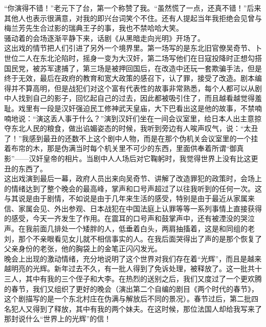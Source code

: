 “你演得不错！”老元下了台，第一个称赞了我。“虽然慌了一点，还真不错！”后来其他人也表示很满意，对我的即兴台词笑个不住。还有人提起当年我拒绝会见曾与梅兰芳先生合过影的瑞典王子的事，我也不禁哈哈大笑。\\

骚动着的会场逐渐平静下来，话剧《从黑暗走向光明》开场了。\\

这出戏的情节把人们引进了另外一个境界里。第一场写的是东北旧官僚吴奇节、卜世位二人在东北沦陷时，摇身一变为大汉奸，第二场写他们在日寇投降时正想勾搭国民党，被苏军逮捕了，第三场是被押回国后，在改造中还玩一套欺骗手法，但是终于无效，最后在政府的教育和宽大政策的感召下，认了罪，接受了改造。剧本编得并不算高明，但是战犯们对这个富有代表性的故事非常熟悉，每个人都可以从剧中人找到自己的影子，回忆起自己的过去，因此都被吸引住了，而且越看越觉得羞耻。戏里有一段是汉奸强迫民工修神武天皇庙，大下巴看出这是他的故事，不禁喃喃地说：“演这丢人事于什么？”演到汉奸们坐在一间会议室里，给日本人出主意掠夺东北人民的粮食，做出谄媚姿态的时候，我听到旁边有人唉声叹气，说：“太丑了！”我感到最丑的还数不上这个剧中人物，而是在那个伪机关会议室里的一个挂着布帘的木，那是伪满当时每个机关里不可少的东西，里面供奉着所谓“御真影”——汉奸皇帝的相片。当剧中人人场后对它鞠躬时，我觉得世界上没有比这更丑的东西了。\\

这出戏演到最后一幕，政府人员出来向吴奇节、讲解了改造罪犯的政策时，会场上的情绪达到了整个晚会的最高峰，掌声和口号声超过了以往我听到的任何一次。这与其说是由于剧情，不如说是由于几年来生活的感受，特别是由于最近从家属来信、家属会见、外出参观、日本战犯在中国法庭上认罪等等一系列事情上直接获得的感受，今天一齐发生了作用。在震耳的口号声和鼓掌声中，还有被湮没的哭泣声。在我前面几排处一个矮胖的人，低垂着白头，两肩抽搐着，这是和同组的老刘，那个不亲眼看见女儿就不相信事实的人。在我后面哭得出了声的是那个恢复了父亲身份的老张，他的胸袋上的金笔正闪闪发光。\\

晚会上出现的激动情绪，充分地说明了这个世界对我们存在着“光辉”，而且是越来越明亮的光辉。新年过去不久，有一批人得到了免诉处理，被释放了。这一批共十三人，其中有我的三个侄子和大李。在热烈的送别之后，我们又度过了一个更欢腾的春节，我们又组织了更好的晚会（演出第二个自编的剧目《两个时代的春节》，这个剧描写的是一个东北村庄在伪满与解放后不同的景况）。春节过后，第二批四名犯人又得到了释放，其中有我的两个妹夫。在这时候，那位法国人却给我写来了那封说什么“世界上的光辉”的信！
